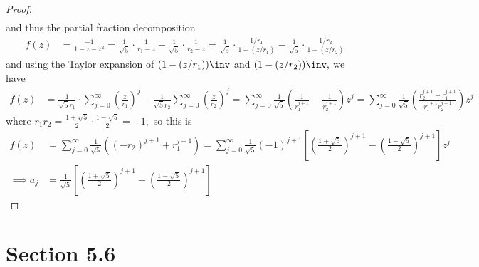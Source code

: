 \documentclass{article}
\begin{document}
\begin{itemize}
\begin{proof}
\begin{align*}
			\end{align*}
			and thus the partial fraction decomposition
			\begin{align*}
				f(z) &= \frac{-1}{1-z-z^2} = \frac{1}{\sqrt{5}}\cdot \frac{1}{r_1-z} - \frac{1}{\sqrt{5}}\cdot \frac{1}{r_2-z} = \frac{1}{\sqrt{5}}\cdot \frac{1/r_1}{1-(z/r_1)} - \frac{1}{\sqrt{5}}\cdot \frac{1/r_2}{1-(z/r_2)}
			\end{align*}
			and using the Taylor expansion of $(1-(z/r_1))\inv$ and $(1-(z/r_2))\inv,$ we have
			\begin{align*}
				f(z) &= \frac{1}{\sqrt{5}r_1}\cdot \sum_{j=0}^{\infty} \left( \frac{z}{r_1} \right)^j - \frac{1}{\sqrt{5}r_2} \sum_{j=0}^{\infty} \left( \frac{z}{r_2} \right)^j = \sum_{j=0}^{\infty} \frac{1}{\sqrt{5}} \left( \frac{1}{r_{1}^{j+1}} - \frac{1}{r_2^{j+1}} \right)z^j = \sum_{j=0}^{\infty} \frac{1}{\sqrt{5}}\left( \frac{r_2^{j+1}-r_1^{j+1}}{r_1^{j+1}r_2^{j+1}} \right)z^j
			\end{align*}
			where $r_1r_2 = \frac{1+\sqrt{5}}{2}\cdot \frac{1-\sqrt{5}}{2} = -1,$ so this is
			\begin{align*}
				f(z) &= \sum_{j=0}^{\infty} \frac{1}{\sqrt{5}} \left( (-r_2)^{j+1} + r_1^{j+1} \right)=\sum_{j=0}^{\infty} \frac{1}{\sqrt{5}} (-1)^{j+1} \left[ \left( \frac{1+\sqrt{5}}{2} \right)^{j+1} - \left( \frac{1-\sqrt{5}}{2} \right)^{j+1} \right]z^j \\
				\implies a_j &= \frac{1}{\sqrt{5}}\left[ \left( \frac{1+\sqrt{5}}{2} \right)^{j+1} - \left( \frac{1-\sqrt{5}}{2} \right)^{j+1} \right]
			\end{align*}
		\end{proof}
		
\end{itemize}

\section*{Section 5.6}
\end{document}

